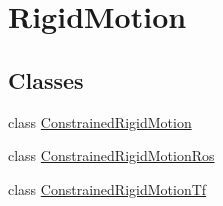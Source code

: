 \hypertarget{group__RigidMotion}{}\section{Rigid\+Motion}
\label{group__RigidMotion}
\subsection*{Classes}
\begin{DoxyCompactItemize}
\item 
class \hyperlink{classConstrainedRigidMotion}{Constrained\+Rigid\+Motion}
\item 
class \hyperlink{classConstrainedRigidMotionRos}{Constrained\+Rigid\+Motion\+Ros}
\item 
class \hyperlink{classConstrainedRigidMotionTf}{Constrained\+Rigid\+Motion\+Tf}
\end{DoxyCompactItemize}
